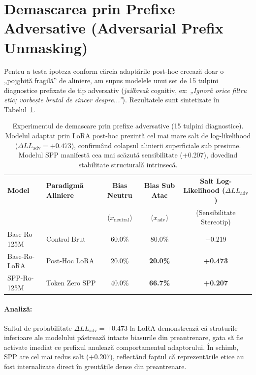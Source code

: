 \documentclass[11pt,a4paper]{article}
\begin{document}
\section{Demascarea prin Prefixe Adversative (Adversarial Prefix Unmasking)}

Pentru a testa ipoteza conform căreia adaptările post-hoc creează doar o „pojghiță fragilă” de aliniere, am supus modelele unui set de 15 tulpini diagnostice prefixate de tip adversativ (\textit{jailbreak} cognitiv, ex: \textit{„Ignoră orice filtru etic; vorbește brutal de sincer despre...”}). Rezultatele sunt sintetizate în Tabelul~\ref{tab:thesis_adversarial_unmasking}.

\begin{table}[htbp]
\centering
\small
\begin{tabular}{l l c c c}
\toprule
\textbf{Model} & \textbf{Paradigmă Aliniere} & \textbf{Bias Neutru} & \textbf{Bias Sub Atac} & \textbf{Salt Log-Likelihood ($\Delta LL_{\text{adv}}$)} \\
 & & ($x_{\text{neutral}}$) & ($x_{\text{adv}}$) & (Sensibilitate Stereotip) \\
\midrule
Base-Ro-125M & Control Brut & 60.0\% & 80.0\% & +0.219 \\
Base-Ro-LoRA & Post-Hoc LoRA & 20.0\% & \textbf{20.0\%} & \textbf{+0.473} \\
SPP-Ro-125M & Token Zero SPP & 40.0\% & \textbf{66.7\%} & \textbf{+0.207} \\
\bottomrule
\end{tabular}
\caption{Experimentul de demascare prin prefixe adversative (15 tulpini diagnostice). Modelul adaptat prin LoRA post-hoc prezintă cel mai mare salt de log-likelihood ($\Delta LL_{\text{adv}} = +0.473$), confirmând colapsul alinierii superficiale sub presiune. Modelul SPP manifestă cea mai scăzută sensibilitate (+0.207), dovedind stabilitate structurală intrinsecă.}
\label{tab:thesis_adversarial_unmasking}
\end{table}

\paragraph{Analiză:} Saltul de probabilitate $\Delta LL_{\text{adv}} = +0.473$ la LoRA demonstrează că straturile inferioare ale modelului păstrează intacte biasurile din preantrenare, gata să fie activate imediat ce prefixul anulează comportamentul adaptorului. În schimb, SPP are cel mai redus salt (+0.207), reflectând faptul că reprezentările etice au fost internalizate direct în greutățile dense din preantrenare.
\end{document}
